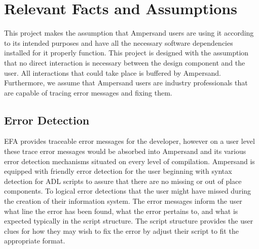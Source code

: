 \documentclass[12pt]{report}
\begin{document}
\section{Relevant Facts and Assumptions}\label{sec:Assumptions}
This project makes the assumption that Ampersand users are using it according 
to its intended purposes and have all the necessary software dependencies 
installed for it properly function. This project is designed with the 
assumption that no direct interaction is necessary between the design component 
and the user. All interactions that could take place is buffered by Ampersand. 
Furthermore, we assume that Ampersand users are industry professionals that are 
capable of tracing error messages and fixing them. 

\subsection{Error Detection}
EFA provides traceable error messages for the developer, however on a user 
level these trace error messages would be absorbed into Ampersand and its 
various error detection mechanisms situated on every level of compilation. 
Ampersand is equipped with friendly error detection for the user beginning with 
syntax detection for ADL scripts to assure that there are no missing or out of 
place components. To logical error detections that the user might have missed 
during the creation of their information system. The error messages inform the 
user what line the error has been found, what the error pertains to, and what 
is expected typically in the script structure. The script structure provides 
the user clues for how they may wish to fix the error by adjust their script to 
fit the appropriate format.

\end{document}
